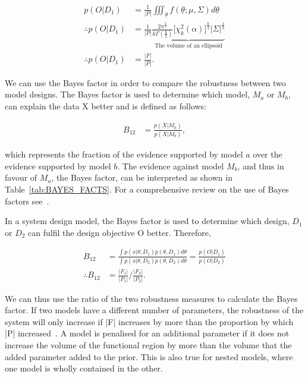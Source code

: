 \begin{align}
p(O|D_1) &= \frac{1}{|P|}\iiint_{\underline{\theta}}f(\underline{\theta};\mu,\Sigma)d\underline{\theta} \\%
\therefore p(O|D_1) &= \frac{1}{|P|}\underbrace{\frac{2\pi^{\frac{k}{2}}}{k\Gamma(\frac{k}{2})} \Big[ \chi _{k}^{2}(\alpha) \Big]^{\frac{k}{2}} |\Sigma|^\frac{1}{2}}_{\text{The volume of an ellipsoid}} \\
\therefore p(O|D_1) &= \frac{|F|}{|P|}.
\end{align}



\noindent We can use the Bayes factor in order to compare the robustness between two model designs. The Bayes factor is used to determine which model, $M_a$ or $M_b$, can explain the data X better and is defined as follows:

\begin{align}
 B_{12} &= \frac{p(X|M_a)}{p(X|M_b)}, \label{eq:final_bayes1}
\end{align}	

\noindent which represents the fraction of the evidence supported by model $a$ over the evidence supported by model $b$. The evidence against model $M_b$, and thus in favour of $M_a$, the Bayes factor, can be interpreted as shown in Table~\ref{tab:BAYES_FACTS}. For a comprehensive review on the use of Bayes factors see~\textcite{Kass:1995vb}.


In a system design model, the Bayes factor is used to determine which design, $D_1$ or $D_2$ can fulfil the design objective O better. Therefore,


\begin{align}
B_{12} &= \frac{\displaystyle \int p(x|\theta, D_1)p(\theta, D_1)d\theta}{\displaystyle \int p(x|\theta, D_2)p(\theta, D_2)d\theta} = \frac{p(O|D_1)}{p(O|D_2)}\\
\therefore B_{12} &= \frac{|F_1|}{|P_1|} / \frac{|F_2|}{|P_2|}. \label{eq:final_bayes}
\end{align}

\noindent We can thus use the ratio of the two robustness measures to calculate the Bayes factor. If two models have a different number of parameters, the robustness of the system will only increase if |F| increases by more than the proportion by which |P| increased~\autocite{Woods:2016eh}. A model is penalised for an additional parameter if it does not increase the volume of the functional region by more than the volume that the added parameter added to the prior. This is also true for nested models, where one model is wholly contained in the other. 


